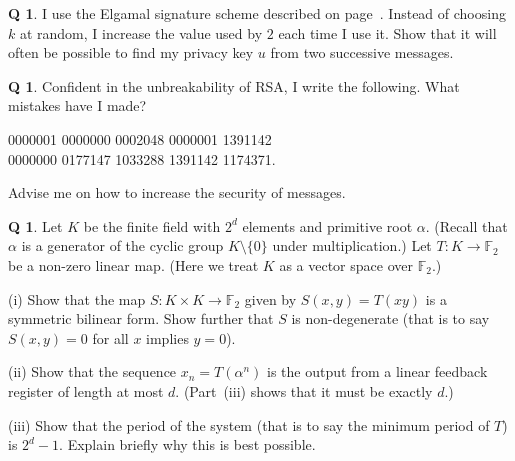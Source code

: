 \documentclass[12pt,a4paper]{article}
\theoremstyle{plain}
\theoremstyle{definition}
\newtheorem{question}[theorem]{Q}
\begin{document}
    \begin{question}
        \label{C4.17}
        I use the Elgamal signature scheme
        described on page~\pageref{P;Elgamal}. Instead of choosing $k$
        at random, I increase the value used by $2$ each time I use it.
        Show that it will often be possible to find
        my privacy key $u$ from two
        successive messages.
    \end{question}
    \begin{question}
        \label{C4.18}
        Confident in the unbreakability of
        RSA, I write the following. What mistakes have I made?
        \begin{center}
            0000001 0000000 0002048 0000001 1391142\\
            0000000 0177147 1033288 1391142 1174371.
        \end{center}
        Advise me on how to increase the security of messages.
    \end{question}
    \begin{question}
        \label{E;maximum period}\label{C4.19}
        Let $K$ be the finite field with $2^{d}$ elements
        and primitive root $\alpha$. (Recall that $\alpha$ is
        a generator of the cyclic group $K\setminus\{0\}$
        under multiplication.) Let $T:K\rightarrow{\mathbb F}_{2}$
        be a non-zero linear map. (Here we treat $K$ as a vector
        space over ${\mathbb F}_{2}$.)

        (i) Show that the map $S:K\times K \rightarrow{\mathbb F}_{2}$
        given by $S(x,y)=T(xy)$ is a symmetric bilinear form.
        Show further that $S$ is non-degenerate
        (that is to say $S(x,y)=0$ for all $x$ implies $y=0$).

        (ii) Show that the sequence $x_{n}=T(\alpha^{n})$
        is the output from a linear feedback register of length
        at most $d$. (Part~(iii) shows that it must be exactly $d$.)

        (iii) Show that the period of the system (that is to say the minimum
        period of $T$) is $2^{d}-1$. Explain briefly why this
        is best possible.
    \end{question}
\end{document}
